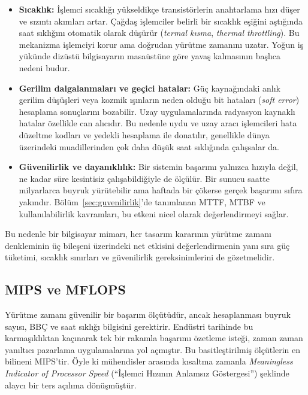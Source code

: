 \begin{itemize}
    \item \textbf{Sıcaklık:} İşlemci sıcaklığı yükseldikçe transistörlerin anahtarlama hızı düşer ve sızıntı akımları artar. Çağdaş işlemciler belirli bir sıcaklık eşiğini aştığında saat sıklığını otomatik olarak düşürür (\emph{termal kısma}, \emph{thermal throttling}). Bu mekanizma işlemciyi korur ama doğrudan yürütme zamanını uzatır. Yoğun iş yükünde dizüstü bilgisayarın masaüstüne göre yavaş kalmasının başlıca nedeni budur.

    \item \textbf{Gerilim dalgalanmaları ve geçici hatalar:} Güç kaynağındaki anlık gerilim düşüşleri veya kozmik ışınların neden olduğu bit hataları (\emph{soft error}) hesaplama sonuçlarını bozabilir. Uzay uygulamalarında radyasyon kaynaklı hatalar özellikle can alıcıdır. Bu nedenle uydu ve uzay aracı işlemcileri hata düzeltme kodları ve yedekli hesaplama ile donatılır, genellikle dünya üzerindeki muadillerinden çok daha düşük saat sıklığında çalışsalar da.

    \item \textbf{Güvenilirlik ve dayanıklılık:} Bir sistemin başarımı yalnızca hızıyla değil, ne kadar süre kesintisiz çalışabildiğiyle de ölçülür. Bir sunucu saatte milyarlarca buyruk yürütebilir ama haftada bir çökerse gerçek başarımı sıfıra yakındır. Bölüm~\ref{sec:guvenilirlik}'de tanımlanan MTTF, MTBF ve kullanılabilirlik kavramları, bu etkeni nicel olarak değerlendirmeyi sağlar.
\end{itemize}

Bu nedenle bir bilgisayar mimarı, her tasarım kararının yürütme zamanı denkleminin üç bileşeni üzerindeki net etkisini değerlendirmenin yanı sıra güç tüketimi, sıcaklık sınırları ve güvenilirlik gereksinimlerini de gözetmelidir.


\subsection{MIPS ve MFLOPS}
\label{subsec:mips-mflops}

Yürütme zamanı güvenilir bir başarım ölçütüdür, ancak hesaplanması buyruk sayısı, BBÇ ve saat sıklığı bilgisini gerektirir. Endüstri tarihinde bu karmaşıklıktan kaçınarak tek bir rakamla başarımı özetleme isteği, zaman zaman yanıltıcı pazarlama uygulamalarına yol açmıştır. Bu basitleştirilmiş ölçütlerin en bilineni MIPS'tir. Öyle ki mühendisler arasında kısaltma zamanla \emph{Meaningless Indicator of Processor Speed} (``İşlemci Hızının Anlamsız Göstergesi'') şeklinde alaycı bir ters açılıma dönüşmüştür.

